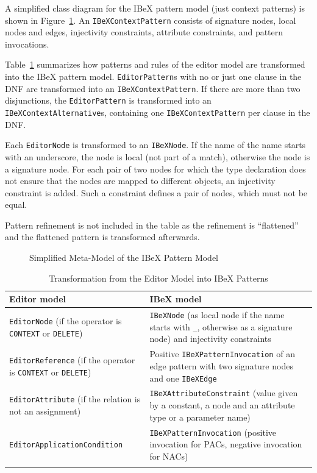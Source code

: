 A simplified class diagram for the IBeX pattern model (just context patterns) is shown in Figure~\ref{fig:ibex-patterns-meta-model}.
An \texttt{IBeXContextPattern} consists of signature nodes, local nodes and edges, injectivity constraints, attribute constraints, and pattern invocations.

Table~\ref{table:ibex-pattern-networks} summarizes how patterns and rules of the editor model are transformed into the IBeX pattern model.
\texttt{EditorPattern}s with no or just one clause in the DNF are transformed into an \texttt{IBeXContextPattern}.
If there are more than two disjunctions, the \texttt{EditorPattern} is transformed into an \texttt{IBeXContextAlternative}s, containing one \texttt{IBeXContextPattern} per clause in the DNF.

Each \texttt{EditorNode} is transformed to an \texttt{IBeXNode}.
If the name of the name starts with an underscore, the node is local (\ie not part of a match), otherwise the node is a signature node.
For each pair of two nodes for which the type declaration does not ensure that the nodes are mapped to different objects, an injectivity constraint is added.
Such a constraint defines a pair of nodes, which must not be equal.

Pattern refinement is not included in the table as the refinement is ``flattened'' and the flattened pattern is transformed afterwards.

\begin{figure}[H]
	\centering
	
	\caption{Simplified Meta-Model of the IBeX Pattern Model}
	\label{fig:ibex-patterns-meta-model}
\end{figure}

\begin{longtable}[h!]{p{55mm}p{85mm}}
	\toprule
	Editor model
		& IBeX model \\
	\midrule
	\texttt{EditorNode} (if the operator is \texttt{CONTEXT} or \texttt{DELETE})
		& \texttt{IBeXNode} (as local node if the name starts with \texttt{\_}, otherwise as a signature node)
			and injectivity constraints \\
	\midrule
	\texttt{EditorReference} (if the operator is \texttt{CONTEXT} or \texttt{DELETE})
		& Positive \texttt{IBeXPatternInvocation} of an edge pattern with two signature nodes and one \texttt{IBeXEdge} \\
	\midrule
	\texttt{EditorAttribute} (if the relation is not an assignment)
		& \texttt{IBeXAttributeConstraint} (value given by a constant, a node and an attribute type or a parameter name) \\
	\midrule
	\texttt{EditorApplicationCondition}
		& \texttt{IBeXPatternInvocation} (positive invocation for PACs, negative invocation for NACs) \\
	\bottomrule
	\caption{Transformation from the Editor Model into IBeX Patterns}
	\label{table:ibex-pattern-networks}
\end{longtable}


